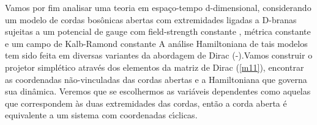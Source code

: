 \documentclass[a4paper,thmsa,12pt]{report}
\begin{document}
Vamos por fim analisar uma teoria em espa\c{c}o-tempo d-dimensional,
considerando um modelo de cordas bos\^{o}nicas abertas com extremidades
ligadas a D-branas sujeitas a um potencial de gauge \coordHE{}
com field-strength constante \coordHE{}, m\'{e}trica constante \coordHE{} e um
campo de Kalb-Ramond constante \coordHE{} A an\'{a}lise
Hamiltoniana de tais modelos tem sido feita em diversas variantes da
abordagem de Dirac (\cite{witten}-\cite{rudy}).Vamos construir o projetor
simpl\'{e}tico atrav\'{e}s dos elementos da matriz de Dirac (\ref{m11}),
encontrar as coordenadas n\~{a}o-vinculadas das cordas abertas e a
Hamiltoniana que governa sua din\^{a}mica. Veremos que se escolhermos as
vari\'{a}veis dependentes como aquelas que correspondem \`{a}s duas
extremidades das cordas, ent\~{a}o a corda aberta \'{e} equivalente a um
sistema com coordenadas c\'{\i}clicas\cite{mmi}.
\end{document}
